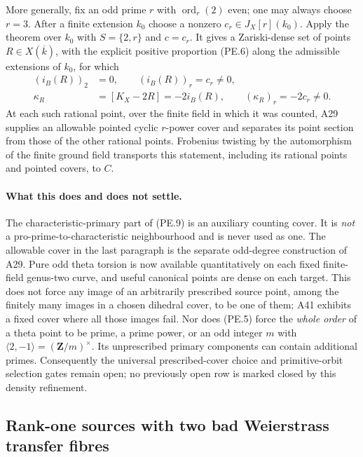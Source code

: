 \documentclass[11pt,a4paper]{article}
\begin{document}
More generally, fix an odd prime $r$ with
$\operatorname{ord}_r(2)$ even; one may always choose $r=3$.
After a finite extension $k_0$ choose a nonzero
$c_r\in J_X[r](k_0)$. Apply the theorem over $k_0$ with
$S=\{2,r\}$ and $c=c_r$. It gives a Zariski-dense set of
points $R\in X(\overline k)$, with the explicit positive
proportion (PE.6) along the admissible extensions of $k_0$, for
which
\[
 \begin{aligned}
 (i_B(R))_2&=0,\qquad (i_B(R))_r=c_r\ne0,\\
 \kappa_R&=[K_X-2R]=-2i_B(R),\qquad
                  (\kappa_R)_r=-2c_r\ne0.
 \end{aligned}
 \tag{PE.15}
\]
At each such rational point, over the finite field in which it
was counted, A29 supplies an allowable pointed cyclic
$r$-power cover and separates its point section from those of
the other rational points. Frobenius twisting by the automorphism
of the finite ground field transports this statement, including
its rational points and pointed covers, to $C$.

\paragraph{What this does and does not settle.}
The characteristic-primary part of (PE.9) is an auxiliary
counting cover. It is \emph{not} a pro-prime-to-characteristic
neighbourhood and is never used as one. The allowable cover in
the last paragraph is the separate odd-degree construction of
A29. Pure odd theta torsion is now available quantitatively on
each fixed finite-field genus-two curve, and useful canonical
points are dense on each target. This does not force any image
of an arbitrarily prescribed source point, among the finitely
many images in a chosen dihedral cover, to be one of them;
A41 exhibits a fixed cover where all those images fail.
Nor does (PE.5) force the \emph{whole order} of a theta point
to be prime, a prime power, or an odd integer $m$ with
$\langle2,-1\rangle=(\mathbf Z/m)^\times$. Its unprescribed
primary components can contain additional primes. Consequently
the universal prescribed-cover choice and primitive-orbit
selection gates remain open; no previously open row is marked
closed by this density refinement.


\subsection{Rank-one sources with two bad Weierstrass transfer fibres}
\end{document}
